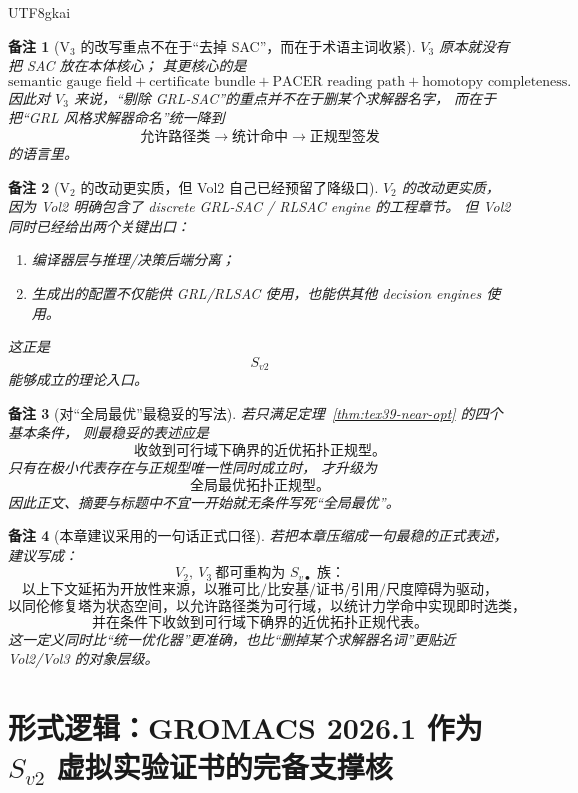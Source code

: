 \documentclass[12pt]{article}
\newtheorem{remark}{备注}[section]
\begin{document}
\begin{CJK*}{UTF8}{gkai}
\begin{remark}[V\(_3\) 的改写重点不在于“去掉 SAC”，而在于术语主词收紧]
$V_3$ 原本就没有把 SAC 放在本体核心；
其更核心的是
\[
  \text{semantic gauge field}
  +
  \text{certificate bundle}
  +
  \text{PACER reading path}
  +
  \text{homotopy completeness}.
\]
因此对 $V_3$ 来说，“剔除 GRL-SAC”的重点并不在于删某个求解器名字，
而在于把“GRL 风格求解器命名”统一降到
\[
  \text{允许路径类}
  \to
  \text{统计命中}
  \to
  \text{正规型签发}
\]
的语言里。
\end{remark}

\begin{remark}[V\(_2\) 的改动更实质，但 Vol2 自己已经预留了降级口]
$V_2$ 的改动更实质，
因为 Vol2 明确包含了 discrete GRL-SAC / RLSAC engine 的工程章节。
但 Vol2 同时已经给出两个关键出口：
\begin{enumerate}
  \item 编译器层与推理/决策后端分离；
  \item 生成出的配置不仅能供 GRL/RLSAC 使用，也能供其他 decision engines 使用。
\end{enumerate}
这正是
\[
  S_{v2}
\]
能够成立的理论入口。
\end{remark}

\begin{remark}[对“全局最优”最稳妥的写法]
若只满足定理~\ref{thm:tex39-near-opt} 的四个基本条件，
则最稳妥的表述应是
\[
  \boxed{
    \text{收敛到可行域下确界的近优拓扑正规型。}
  }
\]
只有在极小代表存在与正规型唯一性同时成立时，
才升级为
\[
  \boxed{
    \text{全局最优拓扑正规型。}
  }
\]
因此正文、摘要与标题中不宜一开始就无条件写死“全局最优”。
\end{remark}

\begin{remark}[本章建议采用的一句话正式口径]
若把本章压缩成一句最稳的正式表述，
建议写成：
\[
  \boxed{
    V_2,\ V_3\ \text{都可重构为 }S_{v\bullet}\text{ 族：}
  }
\]
\[
  \boxed{
    \text{以上下文延拓为开放性来源，}
    \text{以雅可比/比安基/证书/引用/尺度障碍为驱动，}
  }
\]
\[
  \boxed{
    \text{以同伦修复塔为状态空间，}
    \text{以允许路径类为可行域，}
    \text{以统计力学命中实现即时选类，}
  }
\]
\[
  \boxed{
    \text{并在条件下收敛到可行域下确界的近优拓扑正规代表。}
  }
\]
这一定义同时比“统一优化器”更准确，也比“删掉某个求解器名词”更贴近 Vol2/Vol3 的对象层级。
\end{remark}

\section{形式逻辑：GROMACS 2026.1 作为 \texorpdfstring{$S_{v2}$}{S-v2} 虚拟实验证书的完备支撑核}
\label{sec:tex39-ch2}


\end{CJK*}
\end{document}
